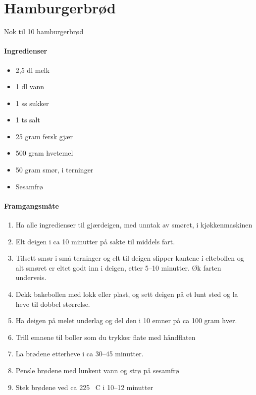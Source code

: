 \section{﻿Hamburgerbrød}
Nok til 10 hamburgerbrød

\paragraph{Ingredienser}
\begin{itemize}[noitemsep]
    \item 2,5 dl melk
    \item 1 dl vann
    \item 1 ss sukker
    \item 1 ts salt
    \item 25 gram fersk gjær
    \item 500 gram hvetemel
    \item 50 gram smør, i terninger
    \item Sesamfrø
\end{itemize}

\paragraph{Framgangsmåte}
\begin{enumerate}[noitemsep]
  \item Ha alle ingredienser til gjærdeigen, med unntak av smøret, i kjøkkenmaskinen
  \item Elt deigen i ca 10 minutter på sakte til middels fart.
  \item Tilsett smør i små terninger og elt til deigen slipper kantene i eltebollen og alt smøret er eltet godt inn i deigen, etter 5--10 minutter. Øk farten underveis.
  \item Dekk bakebollen med lokk eller plast, og sett deigen på et lunt sted og la heve til dobbel størrelse.
  \item Ha deigen på melet underlag og del den i 10 emner på ca 100 gram hver.
  \item Trill emnene til boller som du trykker flate med håndflaten
  \item La brødene etterheve i ca 30--45 minutter.
  \item Pensle brødene med lunkent vann og strø på sesamfrø
  \item Stek brødene ved ca 225 \degree~C i 10--12 minutter
\end{enumerate}
